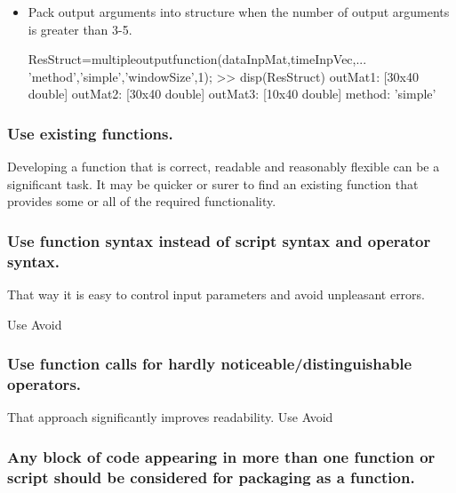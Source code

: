 \documentclass[titlepage,a4paper,12pt]{article}
\begin{document}
\begin{itemize}
\begin{verbmcode}
[dataOutMat,timeOutVec]=aggregatetimeseries(dataInpMat,timeInpVec,...
    'method','advanced');
[dataOutMat,timeOutVec]=aggregatetimeseries(dataInpMat,timeInpVec,...
    'method',1);
\end{verbmcode}


\item

Pack output arguments into structure when the number of output arguments is greater than 3-5.

\begin{verbmcode}
ResStruct=multipleoutputfunction(dataInpMat,timeInpVec,...
'method','simple','windowSize',1);
>> disp(ResStruct)
       outMat1: [30x40 double]
       outMat2: [30x40 double]
       outMat3: [10x40 double]
        method: 'simple'
\end{verbmcode}

\end{itemize}


\subsubsection{Use existing functions.}

 Developing a function that is correct,
readable and reasonably flexible can be a significant task. It may
be quicker or surer to find an existing function that provides some
or all of the required functionality.

\subsubsection{Use function syntax instead of script syntax and operator syntax.}
That way it is easy to control input parameters and avoid unpleasant errors.

Use  Avoid 

\subsubsection{Use function calls for hardly noticeable/distinguishable operators.}
That approach significantly improves readability.
Use  Avoid 

\subsubsection{Any block of code appearing in more than one function or script should be
considered for packaging as a function.}
\end{document}
